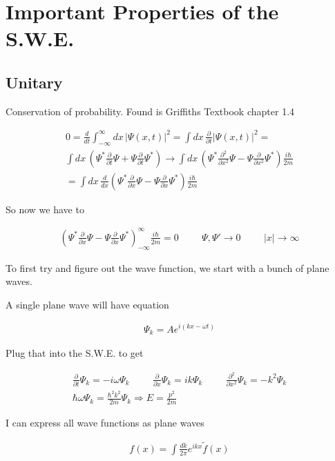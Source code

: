 \documentclass[fleqn]{report}
\newcommand{\hp}{\hspace{1cm}}
\newcommand{\del}{\partial}
\newcommand{\equations} [1] {
\begin{gather*}
#1
\end{gather*}
}
\begin{document}
\section{Important Properties of the S.W.E.}
\subsection{ Unitary }
Conservation of probability.
Found is Griffiths Textbook chapter 1.4

\equations{
    0
    =
    \frac{d}{dt}
    \int^\infty_{-\infty}
    dx \, 
    |\Psi(x, t)|^2 
    =
    \int dx \, 
    \frac{\del}{\del t}
    |\Psi(x, t)|^2
    =
    \\
    \int dx \, 
    \left(
        \Psi^* \frac{\del}{\del t} \Psi 
        +
        \Psi \frac{\del}{\del t}
        \Psi^*
    \right)
    \rightarrow 
    \int dx \, 
    \left(
        \Psi^* \frac{\del^2}{\del x^2} \Psi 
        -
        \Psi \frac{\del}{\del x^2}
        \Psi^*
    \right)
    \frac{i \hbar}{2 m}
    \\
    =
    \int dx \, 
    \frac{d}{dx}
    \left(
        \Psi^* \frac{\del}{\del x} \Psi 
        -
        \Psi \frac{\del}{\del x}
        \Psi^*
    \right)
    \frac{i \hbar}{2 m}
}

So now we have to 

\equations{
    \left(
        \Psi^* \frac{\del}{\del x} \Psi 
        -
        \Psi \frac{\del}{\del x}
        \Psi^*
    \right)^\infty_{-\infty}
    \frac{i \hbar}{2 m}
    =
    0
    \hp 
    \Psi, \Psi' \to 0 
    \hp 
    |x| \to \infty
}

To first try and figure out the wave function, we start with a bunch of 
plane waves. 

A single plane wave will have equation 
\equations{
    \Psi_k 
    =
    A e^{i (kx - \omega t)}
}

Plug that into the S.W.E. to get 

\equations{
    \frac{\del}{\del t}
    \Psi_k 
    =
    -i \omega \Psi_k 
    \hp 
    \frac{\del}{\del x}
    \Psi_k 
    =
    i k \Psi_k 
    \hp 
    \frac{\del^2}{\del x^2}
    \Psi_k 
    =
    -k^2 \Psi_k 
    \\
    \hbar \omega \Psi_k 
    =
    \frac{\hbar^2 k^2}{2 m}
    \Psi_k
    \Rightarrow 
    E 
    =
    \frac{p^2}{2m}
}

I can express all wave functions as plane waves 

\equations{
    f(x)
    =
    \int \frac{dk}{2 \pi}
    e^{ikx}
    \tilde f(x)
}
\end{document}

